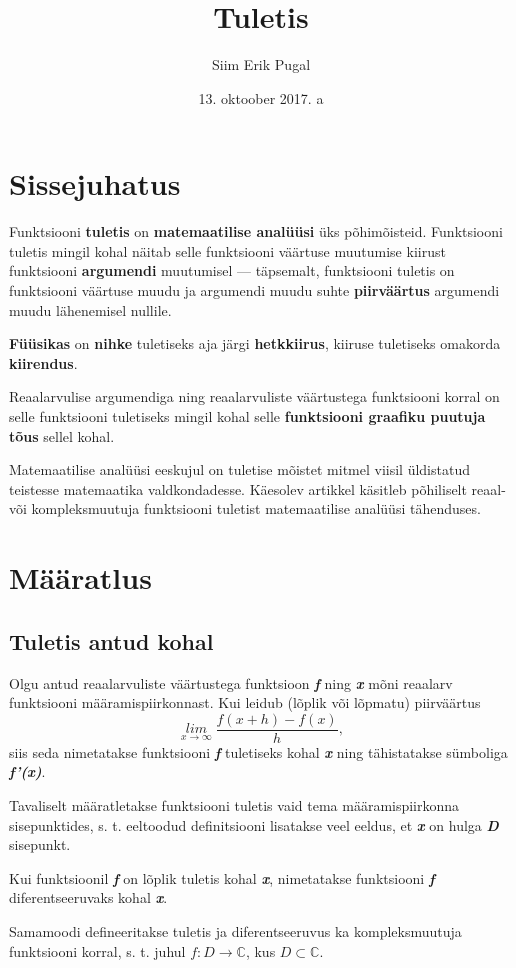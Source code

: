 \documentclass[a4paper]{article}
\title{Tuletis}
\author{Siim Erik Pugal}
\date{13. oktoober 2017. a}
\begin{document}
\maketitle

\section*{Sissejuhatus}
 Funktsiooni \textbf{tuletis} on \textbf{matemaatilise analüüsi} üks põhimõisteid. Funktsiooni tuletis mingil kohal näitab selle funktsiooni väärtuse muutumise kiirust funktsiooni \textbf{argumendi} muutumisel — täpsemalt, funktsiooni tuletis on funktsiooni väärtuse muudu ja argumendi muudu suhte \textbf{piirväärtus} argumendi muudu lähenemisel nullile.

 \textbf{Füüsikas} on \textbf{nihke} tuletiseks aja järgi \textbf{hetkkiirus}, kiiruse tuletiseks omakorda \textbf{kiirendus}.
 
 Reaalarvulise argumendiga ning reaalarvuliste väärtustega funktsiooni korral on selle funktsiooni tuletiseks mingil kohal selle \textbf{funktsiooni graafiku puutuja tõus} sellel kohal.
 
 Matemaatilise analüüsi eeskujul on tuletise mõistet mitmel viisil üldistatud teistesse matemaatika valdkondadesse. Käesolev artikkel käsitleb põhiliselt reaal- või kompleksmuutuja funktsiooni tuletist matemaatilise analüüsi tähenduses.
 
\section{Määratlus}
\subsection{Tuletis antud kohal}
Olgu antud reaalarvuliste väärtustega funktsioon \textbf{\textit{f}}  ning \textbf{\textit{x}} mõni reaalarv funktsiooni määramispiirkonnast. Kui leidub (lõplik või lõpmatu) piirväärtus 
\begin{equation}
\label{N2S}
\mathit{\lim_{x\to\infty} \frac{f(x+h)-f(x)}{h}},
\end{equation} 
siis seda nimetatakse funktsiooni \textbf{\textit{f}} tuletiseks kohal \textbf{\textit{x}} ning tähistatakse sümboliga \textbf{\textit{f'(x)}}.

 Tavaliselt määratletakse funktsiooni tuletis vaid tema määramispiirkonna sisepunktides, s. t. eeltoodud definitsiooni lisatakse veel eeldus, et \textbf{\textit{x}} on hulga \textbf{\textit{D}} sisepunkt.

 Kui funktsioonil \textbf{\textit{f}} on lõplik tuletis kohal \textbf{\textit{x}}, nimetatakse funktsiooni \textbf{\textit{f}} diferentseeruvaks kohal \textbf{\textit{x}}.
 
 Samamoodi defineeritakse tuletis ja diferentseeruvus ka kompleksmuutuja funktsiooni korral, s. t. juhul $f : D \rightarrow \mathbb{C}$, kus $D \subset \mathbb{C}$.
\end{document}
